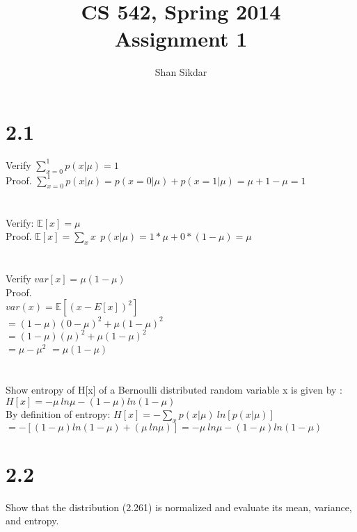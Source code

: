 \documentclass[11pt,leqno,fleqn]{article}
\title{CS 542, Spring 2014
       \\[1ex]
       \textbf{Assignment 1}}
\author{Shan Sikdar}
\date{} %
\begin{document}
\maketitle

\section{ 2.1 }
Verify $ \sum\limits_{x=0}^1 p(x | \mu) =1 $ \\
Proof.  $  \sum\limits_{x=0}^1 p(x | \mu) = p( x = 0 | \mu) + p( x= 1 | \mu) =  \mu + 1 - \mu = 1 $\\
\\
\\
Verify: $\mathbb{E}[x] = \mu$\\
Proof.   $\mathbb{E}[x] =  \sum\limits_{x} x \ \  p(x | \mu)  = 1* \mu + 0*(1 - \mu) = \mu$\\
\\
\\
Verify $var[x] = \mu (1 - \mu) $\\
Proof.  \\
$var(x) = \mathbb{E}[(x - E[x])^2]$\\
$= (1 - \mu )(0 - \mu)^2  + \mu (1 - \mu)^2$\\
$= (1 - \mu )(\mu)^2  + \mu (1 - \mu)^2$\\
$ = \mu - \mu^2 $ $ = \mu(1-\mu)$\\
\\
\\
Show entropy of H[x] of a Bernoulli distributed random variable x is given by : $H[x] = - \mu \  ln \mu - ( 1- \mu) ln(1-\mu)$\\
By definition of entropy: $ H[x] = - \sum\limits_{x} p(x | \mu)  \ ln[p(x | \mu)]  $\\
$= -[ (1 - \mu) ln(1-\mu) + (\mu \ ln \mu)]  =  - \mu \  ln \mu - ( 1- \mu) ln(1-\mu)$

\section{ 2.2} Show that the distribution (2.261) is normalized and evaluate its mean, variance, and entropy.\\
 
\end{document}
